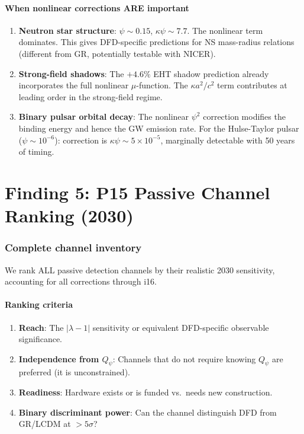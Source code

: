 \documentclass[11pt]{article}
\newcommand{\ee}[1]{\times 10^{#1}}
\begin{document}
\subsection{When nonlinear corrections ARE important}

\begin{enumerate}[nosep]
\item \textbf{Neutron star structure}: $\psi \sim 0.15$,
  $\kappa\psi \sim 7.7$. The nonlinear term dominates. This gives
  DFD-specific predictions for NS mass-radius relations (different
  from GR, potentially testable with NICER).

\item \textbf{Strong-field shadows}: The $+4.6\%$ EHT shadow prediction
  already incorporates the full nonlinear $\mu$-function. The $\kappa a^2/c^2$
  term contributes at leading order in the strong-field regime.

\item \textbf{Binary pulsar orbital decay}: The nonlinear $\psi^2$
  correction modifies the binding energy and hence the GW emission rate.
  For the Hulse-Taylor pulsar ($\psi \sim 10^{-6}$): correction is
  $\kappa\psi \sim 5\ee{-5}$, marginally detectable with 50 years of timing.
\end{enumerate}


\part{Finding 5: P15 Passive Channel Ranking (2030)}
\label{part:p15}

\section{Complete channel inventory}

We rank ALL passive detection channels by their realistic 2030
sensitivity, accounting for all corrections through i16.

\subsection{Ranking criteria}

\begin{enumerate}[nosep]
\item \textbf{Reach}: The $|\lambda - 1|$ sensitivity or equivalent
  DFD-specific observable significance.
\item \textbf{Independence from $Q_\psi$}: Channels that do not require
  knowing $Q_\psi$ are preferred (it is unconstrained).
\item \textbf{Readiness}: Hardware exists or is funded vs.\ needs new
  construction.
\item \textbf{Binary discriminant power}: Can the channel distinguish
  DFD from GR/LCDM at $>5\sigma$?
\end{enumerate}
\end{document}
